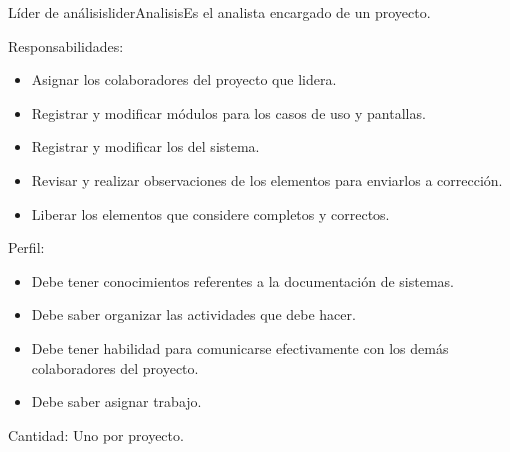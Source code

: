 \begin{actor}{Líder de análisis}{liderAnalisis}{Es el analista encargado de un proyecto.}
    \item[Responsabilidades:] \hspace{1pt}
    \begin{itemize}
	\item Asignar los colaboradores del proyecto que lidera.
	\item Registrar y modificar módulos para los casos de uso y pantallas.
	\item Registrar y modificar los  del sistema.
	\item Revisar y realizar observaciones de los elementos para enviarlos a corrección.
	\item Liberar los elementos que considere completos y correctos.
    \end{itemize}
    \item[Perfil:] \hspace{1pt}
    \begin{itemize}
	\item Debe tener conocimientos referentes a la documentación de sistemas.
	\item Debe saber organizar las actividades que debe hacer.
	\item Debe tener habilidad para comunicarse efectivamente con los demás colaboradores del proyecto.
	\item Debe saber asignar trabajo.
    \end{itemize}
    \item[Cantidad:] Uno por proyecto.
\end{actor}

